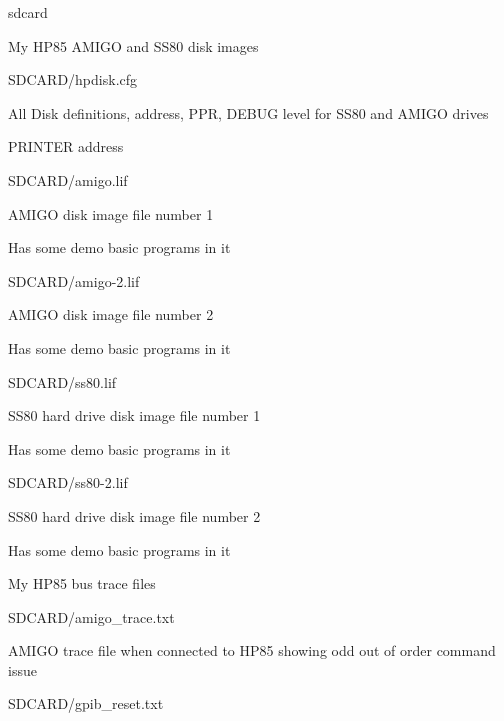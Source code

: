 sdcard
\begin{DoxyItemize}
\item My H\+P85 A\+M\+I\+GO and S\+S80 disk images
\begin{DoxyItemize}
\item S\+D\+C\+A\+R\+D/hpdisk.\+cfg
\begin{DoxyItemize}
\item All Disk definitions, address, P\+PR, D\+E\+B\+UG level for S\+S80 and A\+M\+I\+GO drives
\item P\+R\+I\+N\+T\+ER address
\end{DoxyItemize}
\item S\+D\+C\+A\+R\+D/amigo.\+lif
\begin{DoxyItemize}
\item A\+M\+I\+GO disk image file number 1
\item Has some demo basic programs in it
\end{DoxyItemize}
\item S\+D\+C\+A\+R\+D/amigo-\/2.\+lif
\begin{DoxyItemize}
\item A\+M\+I\+GO disk image file number 2
\item Has some demo basic programs in it
\end{DoxyItemize}
\item S\+D\+C\+A\+R\+D/ss80.\+lif
\begin{DoxyItemize}
\item S\+S80 hard drive disk image file number 1
\item Has some demo basic programs in it
\end{DoxyItemize}
\item S\+D\+C\+A\+R\+D/ss80-\/2.\+lif
\begin{DoxyItemize}
\item S\+S80 hard drive disk image file number 2
\item Has some demo basic programs in it
\end{DoxyItemize}
\end{DoxyItemize}
\item My H\+P85 bus trace files
\begin{DoxyItemize}
\item S\+D\+C\+A\+R\+D/amigo\+\_\+trace.\+txt
\begin{DoxyItemize}
\item A\+M\+I\+GO trace file when connected to H\+P85 showing odd out of order command issue
\end{DoxyItemize}
\item S\+D\+C\+A\+R\+D/gpib\+\_\+reset.\+txt

\end{DoxyItemize}
\end{DoxyItemize}
